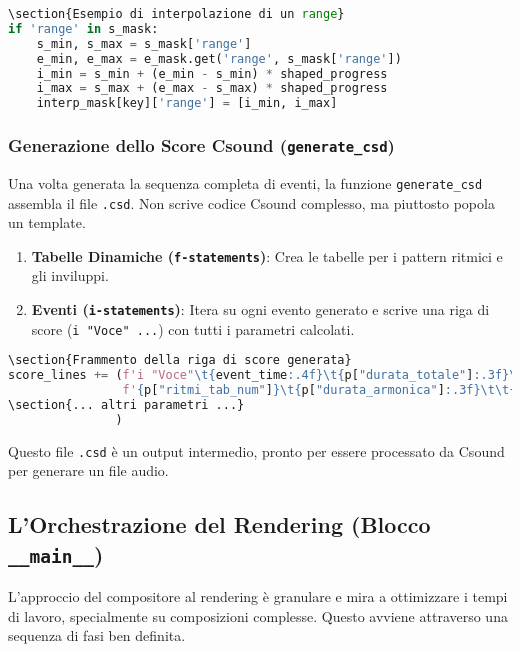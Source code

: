 \begin{lstlisting}[language=Python]
\section{Esempio di interpolazione di un range}
if 'range' in s_mask:
    s_min, s_max = s_mask['range']
    e_min, e_max = e_mask.get('range', s_mask['range'])
    i_min = s_min + (e_min - s_min) * shaped_progress
    i_max = s_max + (e_max - s_max) * shaped_progress
    interp_mask[key]['range'] = [i_min, i_max]
\end{lstlisting}
\subsubsection{Generazione dello Score Csound (\texttt{generate\_csd})}
Una volta generata la sequenza completa di eventi, la funzione \texttt{generate\_csd} assembla il file \texttt{.csd}. Non scrive codice Csound complesso, ma piuttosto popola un template.

\begin{enumerate}
    \item \textbf{Tabelle Dinamiche (\texttt{f{-}statements})}: Crea le tabelle per i pattern ritmici e gli inviluppi.
    \item \textbf{Eventi (\texttt{i{-}statements})}: Itera su ogni evento generato e scrive una riga di score (\texttt{i "Voce" ...}) con tutti i parametri calcolati.
\end{enumerate}
\begin{lstlisting}[language=Python]
\section{Frammento della riga di score generata}
score_lines += (f'i "Voce"\t{event_time:.4f}\t{p["durata_totale"]:.3f}\t'
                f'{p["ritmi_tab_num"]}\t{p["durata_armonica"]:.3f}\t\t{p["dynamic_index"]:.6f}\t'
\section{... altri parametri ...}
               )
\end{lstlisting}
Questo file \texttt{.csd} è un output intermedio, pronto per essere processato da Csound per generare un file audio.
\subsection{L'Orchestrazione del Rendering (Blocco \texttt{\_\_main\_\_})}
L'approccio del compositore al rendering è granulare e mira a ottimizzare i tempi di lavoro, specialmente su composizioni complesse. Questo avviene attraverso una sequenza di fasi ben definita.
